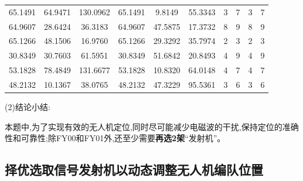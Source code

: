 \documentclass[withoutpreface,bwprint]{cumcmthesis}
\begin{document}
\begin{table}[htbp!]
\begin{tabular}{@{}cccccccccc@{}}
			65.1491                          & 64.9471                          & 130.0962                         & 65.1491                          & 9.8149                           & 55.3343                          & 3                    & 7                    & 3                      & 7                      \\
			64.9607                          & 28.6424                          & 36.3183                          & 64.9607                          & 47.5875                          & 17.3732                          & 8                    & 9                    & 8                      & 9                      \\
			65.1266                          & 48.1506                          & 16.9760                          & 65.1266                          & 29.3292                          & 35.7974                          & 2                    & 3                    & 2                      & 3                      \\
			30.8349                          & 30.7603                          & 61.5951                          & 30.8349                          & 51.6842                          & 20.8493                          & 4                    & 9                    & 4                      & 9                      \\
			53.1828                          & 78.4849                          & 131.6677                         & 53.1828                          & 10.8320                          & 64.0148                          & 4                    & 7                    & 4                      & 7                      \\
			48.2132                          & 10.1367                          & 38.0765                          & 48.2132                          & 47.3229                          & 95.5361                          & 3                    & 6                    & 3                      & 6                      \\ \bottomrule
		\end{tabular}
	\end{table}
	(2)结论小结:
	
	本题中,为了实现有效的无人机定位,同时尽可能减少电磁波的干扰,保持定位的准确性和可靠性;除FY00和FY01外,还至少需要\textbf{再选2架}“发射机”。
	
	\subsection{择优选取信号发射机以动态调整无人机编队位置}
	
\end{document}
